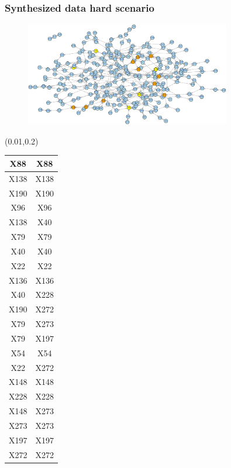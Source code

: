 \documentclass{beamer}
\newcommand{\boz}{\cellcolor{pathwaynode}}
\newcommand{\ghool}{\cellcolor{independentnode}}
\begin{document}
\begin{frame}[plain]
  \frametitle{Synthesized data hard scenario}
  \begin{figure}
    \includegraphics[width=0.8\textwidth]{synthesized-hard}
  \end{figure}
  \begin{textblock*}{\paperwidth}(0.01\textwidth,0.2\textheight)
    \raggedright 
    \tiny
    \begin{tabular}{| c c |}
      \hline
\ghool X88   &  \ghool X88  \\ \hline
\boz X138   &  \boz X138  \\ \hline
\boz X190   &  \boz X190  \\ \hline
\ghool X96   &  \ghool X96  \\ \hline
\boz X138   &  \boz X40  \\ \hline
\boz X79   &  \boz X79  \\ \hline
\boz X40   &  \boz X40  \\ \hline
\boz X22   &  \boz X22  \\ \hline
\ghool X136   &  \ghool X136  \\ \hline
\boz X40   &  \boz X228  \\ \hline
\boz X190   &  \boz X272  \\ \hline
\boz X79   &  \boz X273  \\ \hline
\boz X79   &  \boz X197  \\ \hline
\ghool X54   &  \ghool X54  \\ \hline
\boz X22   &  \boz X272  \\ \hline
\boz X148   &  \boz X148  \\ \hline
\boz X228   &  \boz X228  \\ \hline
\boz X148   &  \boz X273  \\ \hline
\boz X273   &  \boz X273  \\ \hline
\boz X197   &  \boz X197  \\ \hline
\boz X272   &  \boz X272  \\ \hline

\end{tabular}
\end{textblock*}
\end{frame}
\end{document}
